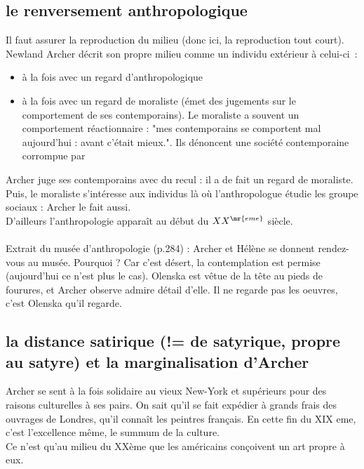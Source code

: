 \documentclass[a4paper,12pt]{article}
\begin{document}
\subsection{le renversement anthropologique}

Il faut assurer la reproduction du milieu (donc ici, la reproduction tout court).\\
Newland Archer décrit son propre milieu comme un individu extérieur à celui-ci~:
\begin{itemize}
    \item à la fois avec un regard d'anthropologique
    \item à la fois avec un regard de moraliste (émet des jugements sur le comportement de ses contemporains). Le moraliste a souvent un comportement réactionnaire : "mes contemporains se comportent mal aujourd'hui : avant c'était mieux.". Ils dénoncent une société contemporaine corrompue par 
\end{itemize}

Archer juge ses contemporains avec du recul : il a de fait un regard de moraliste. Puis, le moraliste s'intéresse aux individus là où l'anthropologue étudie les groupe sociaux : Archer le fait aussi.\\
D'ailleurs l'anthropologie apparaît au début du $XX^{\mr{eme}}$ siècle.\\\\

Extrait du musée d'anthropologie (p.284) : Archer et Hélène se donnent rendez-vous au musée. Pourquoi ? Car c'est désert, la contemplation est permise (aujourd'hui ce n'est plus le cas). Olenska est vêtue de la tête au pieds de fourures, et Archer observe admire détail d'elle. Il ne regarde pas les oeuvres, c'est Olenska qu'il regarde.

\subsection{la distance satirique (!= de satyrique, propre au satyre) et la marginalisation d'Archer}

Archer se sent à la fois solidaire au vieux New-York et supérieurs pour des raisons culturelles à ses pairs. On sait qu'il se fait expédier à grands frais des ouvrages de Londres, qu'il connaît les peintres français. En cette fin du XIX eme, c'est l'excellence même, le summum de la culture.\\
Ce n'est qu'au milieu du XXème que les américains conçoivent un art propre à eux.
\end{document}

